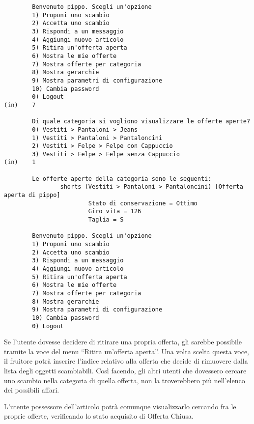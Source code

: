 \begin{lstlisting}
        Benvenuto pippo. Scegli un'opzione
        1) Proponi uno scambio
        2) Accetta uno scambio
        3) Rispondi a un messaggio
        4) Aggiungi nuovo articolo
        5) Ritira un'offerta aperta
        6) Mostra le mie offerte
        7) Mostra offerte per categoria
        8) Mostra gerarchie
        9) Mostra parametri di configurazione
        10) Cambia password
        0) Logout
(in)    7

        Di quale categoria si vogliono visualizzare le offerte aperte?
        0) Vestiti > Pantaloni > Jeans
        1) Vestiti > Pantaloni > Pantaloncini
        2) Vestiti > Felpe > Felpe con Cappuccio
        3) Vestiti > Felpe > Felpe senza Cappuccio
(in)    1

        Le offerte aperte della categoria sono le seguenti: 
                shorts (Vestiti > Pantaloni > Pantaloncini) [Offerta aperta di pippo]
                        Stato di conservazione = Ottimo
                        Giro vita = 126
                        Taglia = S

        Benvenuto pippo. Scegli un'opzione
        1) Proponi uno scambio
        2) Accetta uno scambio
        3) Rispondi a un messaggio
        4) Aggiungi nuovo articolo
        5) Ritira un'offerta aperta
        6) Mostra le mie offerte
        7) Mostra offerte per categoria
        8) Mostra gerarchie
        9) Mostra parametri di configurazione
        10) Cambia password
        0) Logout
\end{lstlisting}

Se l'utente dovesse decidere di ritirare una propria offerta, gli sarebbe possibile tramite la voce del menu ``Ritira un'offerta aperta''. Una volta scelta questa voce, il fruitore potrà inserire l'indice relativo alla offerta che decide di rimuovere dalla lista degli oggetti scambiabili. Così facendo, gli altri utenti che dovessero cercare uno scambio nella categoria di quella offerta, non la troverebbero più nell'elenco dei possibili affari.

L'utente possessore dell'articolo potrà comunque visualizzarlo cercando fra le proprie offerte, verificando lo stato acquisito di Offerta Chiusa.

